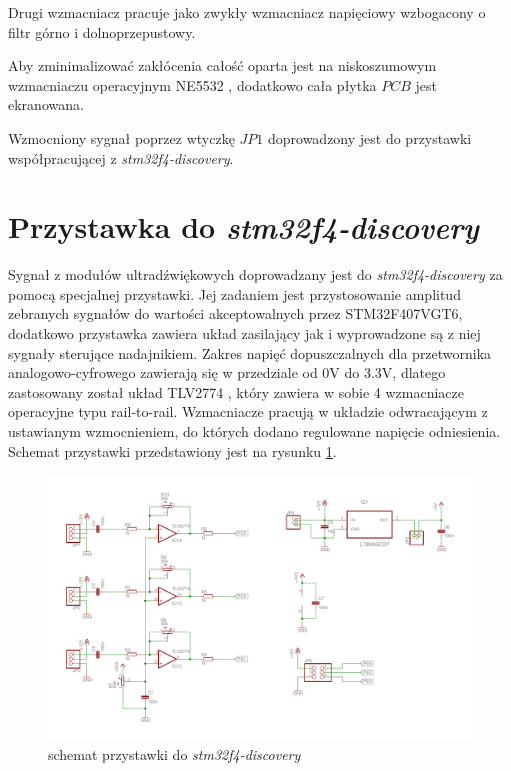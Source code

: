 Drugi wzmacniacz pracuje jako zwykły wzmacniacz napięciowy wzbogacony o filtr górno i dolnoprzepustowy.

Aby zminimalizować zakłócenia całość oparta jest na niskoszumowym wzmacniaczu operacyjnym NE5532 \cite{bib:ne5532}, 
dodatkowo cała płytka $PCB$ jest ekranowana.

Wzmocniony sygnał poprzez wtyczkę $JP1$ doprowadzony jest do przystawki współpracującej z \textit{stm32f4-discovery}.

\clearpage

\section{Przystawka do \textit{stm32f4-discovery}}

Sygnał z modułów ultradźwiękowych doprowadzany jest do \textit{stm32f4-discovery} za pomocą specjalnej przystawki.
Jej zadaniem jest przystosowanie amplitud zebranych sygnałów do wartości akceptowalnych przez STM32F407VGT6,
dodatkowo przystawka zawiera układ zasilający jak i wyprowadzone są z niej sygnały sterujące nadajnikiem.
Zakres napięć dopuszczalnych dla przetwornika analogowo-cyfrowego zawierają się w przedziale od 0V do 3.3V,
dlatego zastosowany został układ TLV2774 \cite{bib:TLV2774}, który zawiera w sobie 4 wzmacniacze operacyjne typu
rail-to-rail. Wzmacniacze pracują w układzie odwracającym z ustawianym wzmocnieniem, do których dodano regulowane napięcie odniesienia.
Schemat przystawki przedstawiony jest na rysunku \ref{fig:przystawka}.



 \begin{figure}[h!]
    \centering
    \includegraphics[width=1\textwidth, trim= 5mm 0mm 0mm 0mm,clip]{mainboard2}
    \caption{schemat przystawki do \textit{stm32f4-discovery}}
    \label{fig:przystawka}
\end{figure}


